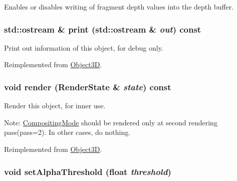 Enables or disables writing of fragment depth values into the depth buffer. \hypertarget{classm3g_1_1CompositingMode_6fea17fa1532df3794f8cb39cb4f911f}{
\subsubsection[{print}]{\setlength{\rightskip}{0pt plus 5cm}std::ostream \& print (std::ostream \& {\em out}) const}}
\label{classm3g_1_1CompositingMode_6fea17fa1532df3794f8cb39cb4f911f}


Print out information of this object, for debug only. 

Reimplemented from \hyperlink{classm3g_1_1Object3D_6fea17fa1532df3794f8cb39cb4f911f}{Object3D}.\hypertarget{classm3g_1_1CompositingMode_8babc8a79b78615da51161e94029eea9}{
\subsubsection[{render}]{\setlength{\rightskip}{0pt plus 5cm}void render ({\bf RenderState} \& {\em state}) const}}
\label{classm3g_1_1CompositingMode_8babc8a79b78615da51161e94029eea9}


Render this object, for inner use.

Note: \hyperlink{classm3g_1_1CompositingMode}{CompositingMode} should be rendered only at second rendering pass(pass=2). In other cases, do nothing. 

Reimplemented from \hyperlink{classm3g_1_1Object3D_8babc8a79b78615da51161e94029eea9}{Object3D}.\hypertarget{classm3g_1_1CompositingMode_6becafaefd18a2b8b1adeba491576837}{
\subsubsection[{setAlphaThreshold}]{\setlength{\rightskip}{0pt plus 5cm}void setAlphaThreshold (float {\em threshold})}}
\label{classm3g_1_1CompositingMode_6becafaefd18a2b8b1adeba491576837}


